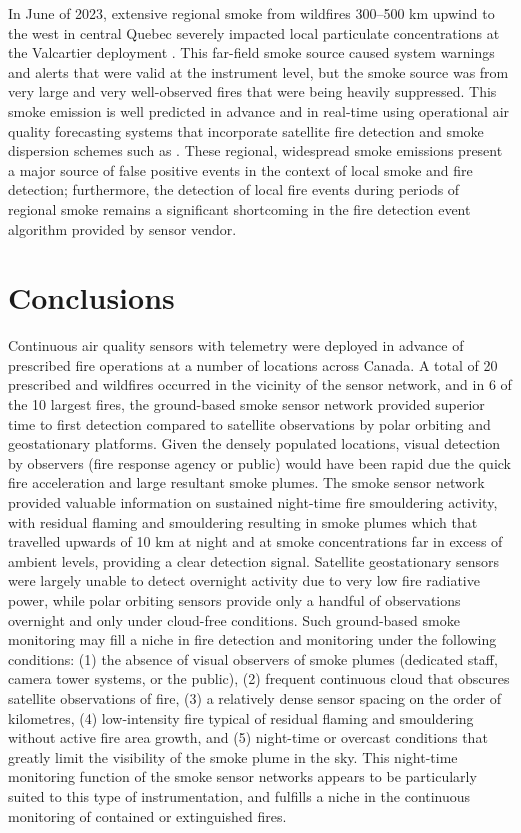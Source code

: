 \documentclass[fire,article,submit,moreauthors]{mdpi}
\begin{document}
In June of 2023, extensive regional smoke from wildfires 300--500 km
upwind to the west in central Quebec severely impacted local particulate
concentrations at the Valcartier deployment
\citep{matz2025, boulanger2024}. This far-field smoke source caused
system warnings and alerts that were valid at the instrument level, but
the smoke source was from very large and very well-observed fires that
were being heavily suppressed. This smoke emission is well predicted in
advance and in real-time using operational air quality forecasting
systems that incorporate satellite fire detection and smoke dispersion
schemes such as \citet{chenFireWorkV20Air2019}. These regional,
widespread smoke emissions present a major source of false positive
events in the context of local smoke and fire detection; furthermore,
the detection of local fire events during periods of regional smoke
remains a significant shortcoming in the fire detection event algorithm
provided by sensor vendor.

\section{Conclusions}\label{conclusions}

Continuous air quality sensors with telemetry were deployed in advance
of prescribed fire operations at a number of locations across Canada. A
total of 20 prescribed and wildfires occurred in the vicinity of the
sensor network, and in 6 of the 10 largest fires, the ground-based smoke
sensor network provided superior time to first detection compared to
satellite observations by polar orbiting and geostationary platforms.
Given the densely populated locations, visual detection by observers
(fire response agency or public) would have been rapid due the quick
fire acceleration and large resultant smoke plumes. The smoke sensor
network provided valuable information on sustained night-time fire
smouldering activity, with residual flaming and smouldering resulting in
smoke plumes which that travelled upwards of 10 km at night and at smoke
concentrations far in excess of ambient levels, providing a clear
detection signal. Satellite geostationary sensors were largely unable to
detect overnight activity due to very low fire radiative power, while
polar orbiting sensors provide only a handful of observations overnight
and only under cloud-free conditions. Such ground-based smoke monitoring
may fill a niche in fire detection and monitoring under the following
conditions: (1) the absence of visual observers of smoke plumes
(dedicated staff, camera tower systems, or the public), (2) frequent
continuous cloud that obscures satellite observations of fire, (3) a
relatively dense sensor spacing on the order of kilometres, (4)
low-intensity fire typical of residual flaming and smouldering without
active fire area growth, and (5) night-time or overcast conditions that
greatly limit the visibility of the smoke plume in the sky. This
night-time monitoring function of the smoke sensor networks appears to
be particularly suited to this type of instrumentation, and fulfills a
niche in the continuous monitoring of contained or extinguished fires.
\end{document}
